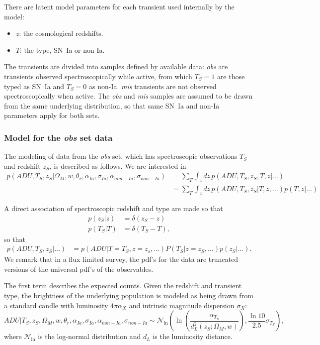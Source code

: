 \documentclass[preprint]{elsarticle}
\begin{document}
There are latent model parameters for each transient used internally
by the model:
\begin{itemize}
\item $z$: the cosmological redshifts.
\item $T$: the type, SN~Ia or non-Ia.
\end{itemize}

The transients are divided into samples defined by available data: {\it obs} are transients observed spectroscopically while active, from which $T_S=1$ are those typed
as SN~Ia and $T_S=0$ as non-Ia.  {\it mis} transients are not observed
spectroscopically when active.  The  {\it obs} and {\it mis} samples
are assumed to be drawn from the same underlying distribution, so that 
same SN~Ia and non-Ia parameters apply for both sets.

\subsubsection{Model for the {\it obs} set data}
The modeling of data from the {\it obs} set, which has
spectroscopic observations $T_S$ and redshift
$z_S$, is described as follows.  We are interested in
\begin{align}
p(\mathit{ADU}, {{T}}_S,{{z}}_S|  \Omega_M, w, \theta_r,\alpha_{Ia},\sigma_{Ia}, \alpha_{\mathit{non-Ia}},\sigma_{\mathit{non-Ia}})  &=\sum_T \int_z dz\,
p(\mathit{ADU}, {{T}}_S,{{z}}_S, T, z| \ldots)\\
&= \sum_T \int_z dz\,
p(\mathit{ADU}, {{T}}_S,{{z}}_S| T, z,\dots) p(T,z | \ldots)
\end{align}

A direct association of spectroscopic redshift and type are made so that
\begin{align}
p(z_S|z) &= \delta(z_S-z)\\
p(T_S|T) &= \delta(T_S-T),
\label{specz:eqn}
\end{align}
so that
\begin{align}
p(\mathit{ADU}, {{T}}_S,{{z}}_S|  \ldots) &= 
p(\mathit{ADU}| T=T_S, z=z_s,\dots) P(T_S| z= z_S , \ldots) p(z_S|\ldots).
\label{obs:eqn}
\end{align}
We remark that in a flux limited survey, the pdf's for the data are truncated versions of the universal
pdf's of the observables.

The first term describes the expected counts. Given the redshift
and transient type, the brightness of the underlying population
is modeled as being drawn from a standard candle
with luminosity $4\pi\alpha_X$ and intrinsic magnitude dispersion  $\sigma_X$:
\begin{equation}
\mathit{ADU}| T_S, z_S, \Omega_M, w, \theta_r, \alpha_{Ia},\sigma_{Ia}, \alpha_{\mathit{non-Ia}},\sigma_{\mathit{non-Ia}} \sim \mathcal{N}_{\ln}\left(\ln{\left(\frac{\alpha_{T_S}}{d_L^2(z_S;\Omega_M, w)}\right)}, \frac{\ln{10}}{2.5}\sigma_{T_S}\right),
\end{equation}
where $\mathcal{N}_{\ln}$ is the log-normal distribution and $d_L$ is the luminosity distance.
\end{document}
